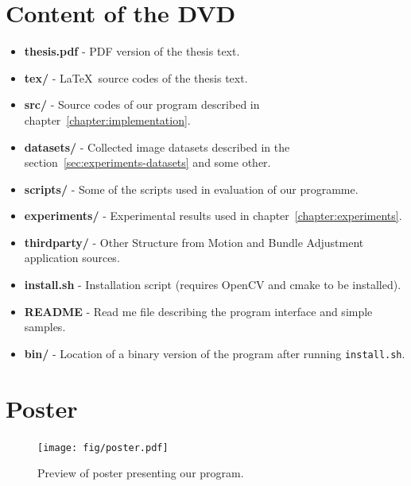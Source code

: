 \chapter{Content of the DVD}
\begin{itemize}
	\item \textbf{thesis.pdf} - PDF version of the thesis text.
	\item \textbf{tex/} - \LaTeX ~source codes of the thesis text.
	\item \textbf{src/} - Source codes of our program described in chapter~\ref{chapter:implementation}.
	\item \textbf{datasets/} - Collected image datasets described in the section~\ref{sec:experiments-datasets} and some other.
	\item \textbf{scripts/} - Some of the scripts used in evaluation of our programme.
	\item \textbf{experiments/} - Experimental results used in chapter~\ref{chapter:experiments}.
	\item \textbf{third\textunderscore party/} - Other Structure from Motion and Bundle Adjustment application sources.
	\item \textbf{install.sh} - Installation script (requires OpenCV and cmake to be installed).
	\item \textbf{README} - Read me file describing the program interface and simple samples.
	\item \textbf{bin/} - Location of a binary version of the program after running \texttt{install.sh}.
\end{itemize}
\chapter{Poster}
\begin{figure}[h]
	\begin{center}
		\texttt{[image: fig/poster.pdf]}
	\end{center}
	\caption{Preview of poster presenting our program.}
	\label{fig:posteri}
\end{figure}

